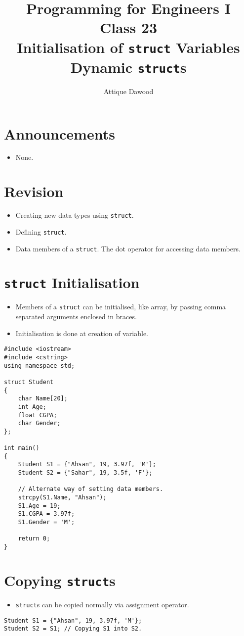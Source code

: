 \documentclass[12pt,a4paper]{article}
\title{\vspace{-2cm}Programming for Engineers I\\Class 23\\Initialisation of \texttt{struct} Variables\\Dynamic \texttt{struct}s}
\author{Attique Dawood}
\begin{document}
\maketitle
\section{Announcements}
\begin{itemize}
\item None.
\end{itemize}
\section{Revision}
\begin{itemize}
\item Creating new data types using \verb|struct|.
\item Defining \verb|struct|.
\item Data members of a \verb|struct|. The dot operator for accessing data members.
\end{itemize}
\section{\texttt{struct} Initialisation}
\begin{itemize}
\item Members of a \verb|struct| can be initialised, like array, by passing comma separated arguments enclosed in braces.
\item Initialisation is done at creation of variable.
\end{itemize}
\begin{lstlisting}[caption={\texttt{struct} Initialisation}]
#include <iostream>
#include <cstring>
using namespace std;

struct Student
{
	char Name[20];
	int Age;
	float CGPA;
	char Gender;
};

int main()
{
	Student S1 = {"Ahsan", 19, 3.97f, 'M'};
	Student S2 = {"Sahar", 19, 3.5f, 'F'};

	// Alternate way of setting data members.
	strcpy(S1.Name, "Ahsan");
	S1.Age = 19;
	S1.CGPA = 3.97f;
	S1.Gender = 'M';

	return 0;
}
\end{lstlisting}
\section{Copying \texttt{struct}s}
\begin{itemize}
\item \texttt{struct}s can be copied normally via assignment operator.
\end{itemize}
\begin{lstlisting}
Student S1 = {"Ahsan", 19, 3.97f, 'M'};
Student S2 = S1; // Copying S1 into S2.
\end{lstlisting}
\end{document}
